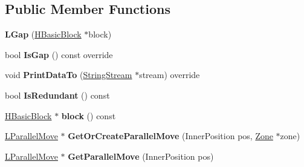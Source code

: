 \subsection*{Public Member Functions}
\begin{DoxyCompactItemize}
\item 
{\bfseries L\+Gap} (\hyperlink{classv8_1_1internal_1_1_h_basic_block}{H\+Basic\+Block} $\ast$block)\hypertarget{classv8_1_1internal_1_1_l_gap_a065fcd3080fabb91cccfc541f7cf90f0}{}\label{classv8_1_1internal_1_1_l_gap_a065fcd3080fabb91cccfc541f7cf90f0}

\item 
bool {\bfseries Is\+Gap} () const  override\hypertarget{classv8_1_1internal_1_1_l_gap_aac0749ec3212db7ad37d7fcb6a7a31fd}{}\label{classv8_1_1internal_1_1_l_gap_aac0749ec3212db7ad37d7fcb6a7a31fd}

\item 
void {\bfseries Print\+Data\+To} (\hyperlink{classv8_1_1internal_1_1_string_stream}{String\+Stream} $\ast$stream) override\hypertarget{classv8_1_1internal_1_1_l_gap_ad22b85643ee0ccf9a50f8cc0e73abc19}{}\label{classv8_1_1internal_1_1_l_gap_ad22b85643ee0ccf9a50f8cc0e73abc19}

\item 
bool {\bfseries Is\+Redundant} () const \hypertarget{classv8_1_1internal_1_1_l_gap_afd74524d060224489b5e7095e3354e1e}{}\label{classv8_1_1internal_1_1_l_gap_afd74524d060224489b5e7095e3354e1e}

\item 
\hyperlink{classv8_1_1internal_1_1_h_basic_block}{H\+Basic\+Block} $\ast$ {\bfseries block} () const \hypertarget{classv8_1_1internal_1_1_l_gap_a14ee6777d69e95f0c17ce3dcc0c6431e}{}\label{classv8_1_1internal_1_1_l_gap_a14ee6777d69e95f0c17ce3dcc0c6431e}

\item 
\hyperlink{classv8_1_1internal_1_1_l_parallel_move}{L\+Parallel\+Move} $\ast$ {\bfseries Get\+Or\+Create\+Parallel\+Move} (Inner\+Position pos, \hyperlink{classv8_1_1internal_1_1_zone}{Zone} $\ast$zone)\hypertarget{classv8_1_1internal_1_1_l_gap_afa07f91a1bdbab70770e57c45a4c93cd}{}\label{classv8_1_1internal_1_1_l_gap_afa07f91a1bdbab70770e57c45a4c93cd}

\item 
\hyperlink{classv8_1_1internal_1_1_l_parallel_move}{L\+Parallel\+Move} $\ast$ {\bfseries Get\+Parallel\+Move} (Inner\+Position pos)\hypertarget{classv8_1_1internal_1_1_l_gap_a80a7bd7cd4beef3be42928544646c5fb}{}\label{classv8_1_1internal_1_1_l_gap_a80a7bd7cd4beef3be42928544646c5fb}


\end{DoxyCompactItemize}
